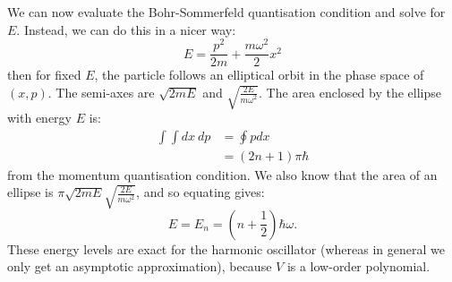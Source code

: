 \documentclass[../Main.tex]{subfiles}
\begin{document}
We can now evaluate the Bohr-Sommerfeld quantisation condition and solve for $E$. Instead, we can do this in a nicer way:
\begin{equation*}
    E = \frac{p^2}{2m} + \frac{m\omega^2}{2} x^2
\end{equation*}
then for fixed $E$, the particle follows an elliptical orbit in the phase space of $(x, p)$. The semi-axes are $\sqrt{2mE}$ and $\sqrt{\frac{2E}{m\omega^2}}$. The area enclosed by the ellipse with energy $E$ is:
\begin{align*}
    \int\int dx~dp &= \oint p dx \\
    &= (2n+1) \pi \hbar
\end{align*}
from the momentum quantisation condition. We also know that the area of an ellipse is $\pi \sqrt{2mE}\sqrt{\frac{2E}{m\omega^2}}$, and so equating gives:
\begin{equation*}
    E = E_n = \left(n + \frac12\right)\hbar \omega.
\end{equation*}
These energy levels are exact for the harmonic oscillator (whereas in general we only get an asymptotic approximation), because $V$ is a low-order polynomial.
\end{document}
